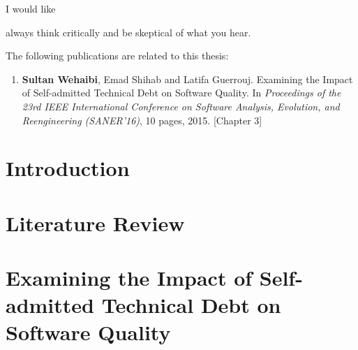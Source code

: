 \documentclass[12pt]{report}
\begin{document}
\begin{acknowledgments}

I would like 

\end{acknowledgments}



\begin{dedication}
	\begin{flushright}
	always think critically and be skeptical of what you hear.\\
	\end{flushright}
\end{dedication}

\begin{publications}

The following publications are related to this thesis:

\begin{enumerate}

\item \textbf{Sultan Wehaibi}, Emad Shihab and Latifa Guerrouj. Examining the Impact of Self-admitted Technical Debt on Software Quality. In \textit{Proceedings of the 23rd IEEE International Conference on Software Analysis, Evolution, and Reengineering (SANER’16)}, 10 pages, 2015. [Chapter 3]


\end{enumerate}

\end{publications}

\chapter{Introduction}
\label{introduction}


\chapter{Literature Review}
\label{literature_review}


\chapter{Examining the Impact of Self-admitted Technical Debt on Software Quality}
\label{chapter3}

\end{document}
